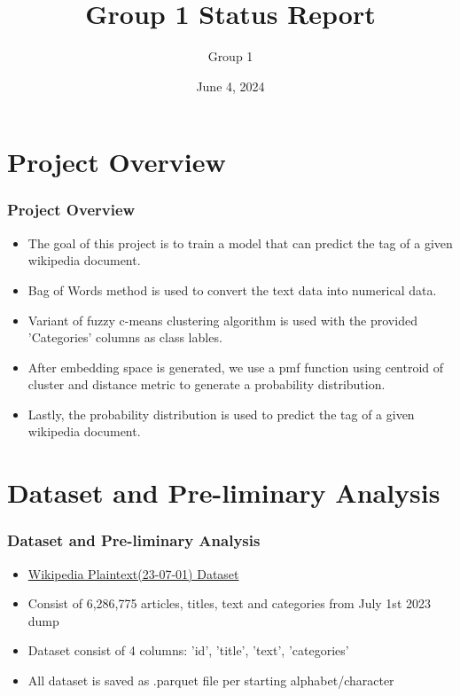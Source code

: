 \documentclass[
    10pt %
    16:9, %
]{beamer}
\title{Group 1 Status Report}
\subtitle{}
\author{Group 1}
\date[June 4, 2024]
 {June 4, 2024}
\begin{document}
\frame{\titlepage} %
\section[Outline]{}
\frame{\tableofcontents}

\section{Project Overview}
 
 
\frame %
{
  \frametitle{Project Overview}
  \begin{itemize}
    \item The goal of this project is to train a model that can predict the tag of a given wikipedia document.
    \item Bag of Words method is used to convert the text data into numerical data.
    \item Variant of fuzzy c-means clustering algorithm is used with the provided 'Categories' columns as class lables.
    \item After embedding space is generated, we use a pmf function using centroid of cluster and distance metric to generate a probability distribution.
    \item Lastly, the probability distribution is used to predict the tag of a given wikipedia document.
  \end{itemize}
}
\section{Dataset and Pre-liminary Analysis}
\frame
{
  \frametitle{Dataset and Pre-liminary Analysis}
  \begin{itemize}
    \item \href{https://www.kaggle.com/datasets/jjinho/wikipedia-20230701/data}{Wikipedia Plaintext(23-07-01) Dataset}
    \item Consist of 6,286,775 articles, titles, text and categories from July 1st 2023 dump
    \item Dataset consist of 4 columns: 'id', 'title', 'text', 'categories'
    \item All dataset is saved as .parquet file per starting alphabet/character
  \end{itemize}
}
\end{document}
